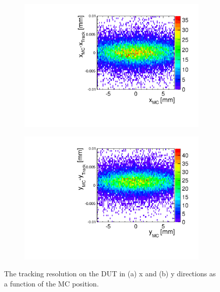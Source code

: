 \begin{figure}[htbp] \centering
  \begin{subfigure}[b]{0.45\textwidth}
    \includegraphics[width=\textwidth]{figures/Telescope/Unbiased_trackRes_DUT_x_2D.pdf}
    \caption{}
  \end{subfigure}\hfill
  \begin{subfigure}[b]{0.45\textwidth}
    \includegraphics[width=\textwidth]{figures/Telescope/Unbiased_trackRes_DUT_y_2D.pdf}
    \caption{}
  \end{subfigure}
  \caption{The tracking resolution on the DUT in (a) x and (b) y
    directions as a function of the MC position.}
  \label{fig:DUT_MC_track_2D}
\end{figure}




